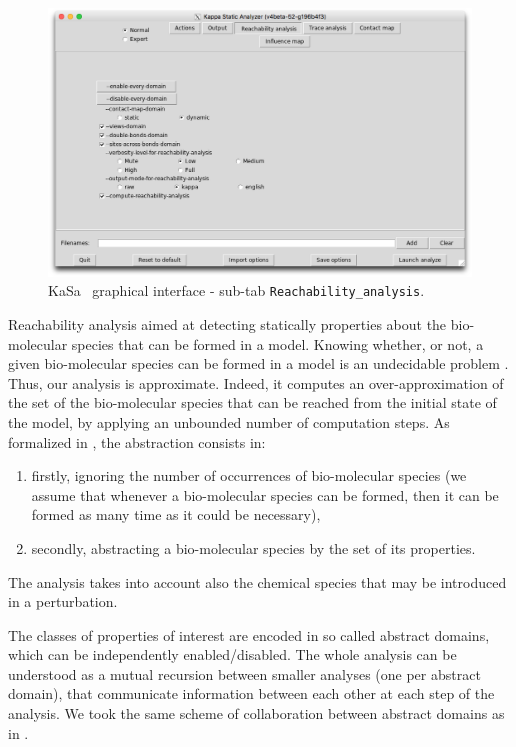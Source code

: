 \documentclass[11pt]{book}
\def\KaSa{\textsf{KaSa}}
\begin{document}
\begin{figure}[htbp]
\centering
\includegraphics[width=12cm,bb=0 0 1904 1208]{img/kasa_2.png}
\caption{\KaSa~ graphical interface - sub-tab \texttt{Reachability\_analysis}.}
\label{fig:kasa:2}
\end{figure}

Reachability analysis aimed at detecting statically properties about the bio-molecular species that can be formed in a model.
Knowing whether, or not, a given bio-molecular species can be formed in a model is an undecidable problem \cite{Kreyssig}. Thus, our analysis is approximate. Indeed, it computes an over-approximation of the set of the bio-molecular species that can be reached from the initial state of the model, by applying an unbounded number of computation steps. As formalized in \cite{DanosEtAl-VMCAI08,Feret:SASB2016}, the abstraction consists in:
\begin{enumerate}
\item firstly, ignoring the number of occurrences of bio-molecular species (we assume that whenever a bio-molecular species can be formed, then it can be formed as many time as it could be necessary),
\item secondly, abstracting a bio-molecular species by the set of its properties.
\end{enumerate}
The analysis takes into account also the chemical species that may be introduced in a perturbation.

The classes of properties of interest are encoded in so called abstract domains, which can be independently enabled/disabled. The whole analysis can be understood as a mutual recursion between smaller analyses (one per abstract domain), that communicate information between each other at each step of the analysis. We took the same scheme of collaboration between abstract domains as in  \cite{CousotEtAl06-ASIAN}.
\end{document}
